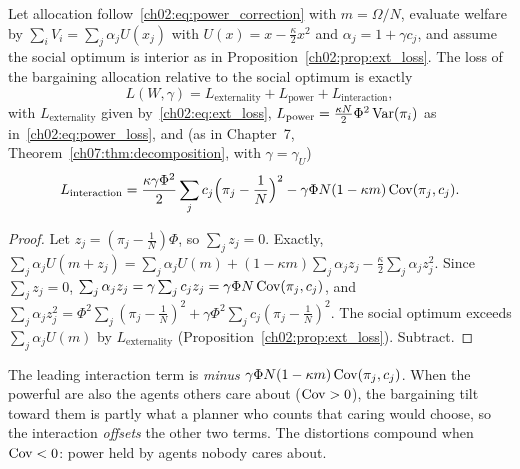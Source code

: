 \documentclass[../structural_economics_book.tex]{subfiles}
\begin{document}
\begin{theorem}\label{ch02:thm:welfare_loss}
Let allocation follow~\eqref{ch02:eq:power_correction} with $m = \Omega/N$, evaluate welfare by $\sum_i V_i = \sum_j \alpha_j U(x_j)$ with $U(x) = x - \frac{\kappa}{2}x^2$ and $\alpha_j = 1 + \gamma c_j$, and assume the social optimum is interior as in Proposition~\ref{ch02:prop:ext_loss}. The loss of the bargaining allocation relative to the social optimum is exactly
\begin{equation}\label{ch02:eq:full_decomposition}
L(W, \gamma) = L_{\text{externality}} + L_{\text{power}} + L_{\text{interaction}},
\end{equation}
with $L_{\text{externality}}$ given by~\eqref{ch02:eq:ext_loss}, $L_{\text{power}} = \frac{\kappa N}{2}\Phi^2\operatorname{Var}(\pi_i)$ as in~\eqref{ch02:eq:power_loss}, and (as in Chapter~7, Theorem~\ref{ch07:thm:decomposition}, with $\gamma = \gamma_U$)
\begin{equation}\label{ch02:eq:L_int}
L_{\text{interaction}} = \frac{\kappa\gamma\Phi^2}{2}\sum_j c_j\Bigl(\pi_j - \frac{1}{N}\Bigr)^2 - \gamma\Phi N(1 - \kappa m)\operatorname{Cov}(\pi_j, c_j).
\end{equation}
\end{theorem}

\begin{proof}
Let $z_j = (\pi_j - \frac{1}{N})\Phi$, so $\sum_j z_j = 0$. Exactly, $\sum_j\alpha_j U(m + z_j) = \sum_j\alpha_j U(m) + (1-\kappa m)\sum_j\alpha_j z_j - \frac{\kappa}{2}\sum_j\alpha_j z_j^2$. Since $\sum_j z_j = 0$, $\sum_j\alpha_j z_j = \gamma\sum_j c_j z_j = \gamma\Phi N\operatorname{Cov}(\pi_j, c_j)$, and $\sum_j\alpha_j z_j^2 = \Phi^2\sum_j(\pi_j - \frac1N)^2 + \gamma\Phi^2\sum_j c_j(\pi_j - \frac1N)^2$. The social optimum exceeds $\sum_j\alpha_j U(m)$ by $L_{\text{externality}}$ (Proposition~\ref{ch02:prop:ext_loss}). Subtract.
\end{proof}

The leading interaction term is \textit{minus} $\gamma\Phi N(1-\kappa m)\operatorname{Cov}(\pi_j, c_j)$. When the powerful are also the agents others care about ($\operatorname{Cov} > 0$), the bargaining tilt toward them is partly what a planner who counts that caring would choose, so the interaction \textit{offsets} the other two terms. The distortions compound when $\operatorname{Cov} < 0$: power held by agents nobody cares about.
\end{document}
